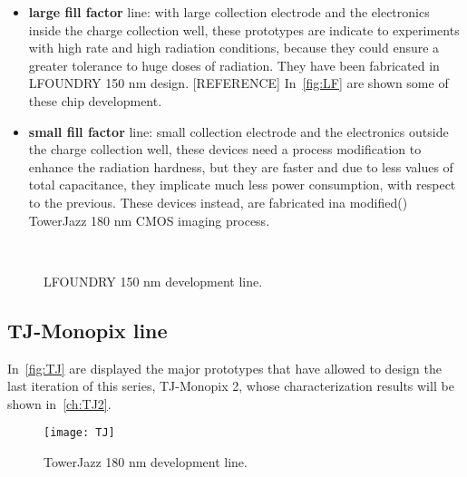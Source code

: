 \begin{itemize}
\item \textbf{large fill factor} line: with large collection electrode and the electronics inside the charge collection well, these prototypes are indicate to experiments with high rate and high radiation conditions, because they could ensure a greater tolerance to huge doses of radiation. They have been fabricated in LFOUNDRY 150 nm design. [REFERENCE] In~\autoref{fig:LF} are shown some of these chip development.
\item \textbf{small fill factor} line: small collection electrode and the electronics outside the charge collection well, these devices need a process modification to enhance the radiation hardness, but they are faster and due to less values of total capacitance, they implicate much less power consumption, with respect to the previous. These devices instead, are fabricated ina modified() TowerJazz 180 nm CMOS imaging process.
\end{itemize}

\begin{figure}[h!]
\centering
\subfigure[CCPD\_LF]
{\texttt{[image: LF1]}}\quad
\subfigure[LF-CPIX]
{\texttt{[image: LF2]}}\quad
\subfigure[LF-MONOPIX 1]
{\texttt{[image: LF3]}}\\
\caption{LFOUNDRY 150 nm development line.}
\label{fig:LF}
\end{figure}


\subsection{TJ-Monopix line}

In~\autoref{fig:TJ} are displayed the major prototypes that have allowed to design the last iteration of this series, TJ-Monopix 2, whose characterization results will be shown in~\autoref{ch:TJ2}.

\begin{figure}[h!]
\centering
\texttt{[image: TJ]}
\caption{TowerJazz 180 nm development line.}
\label{fig:TJ}
\end{figure}

